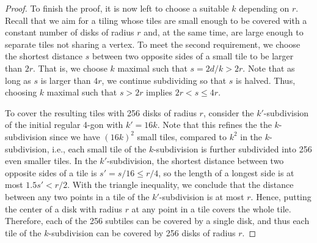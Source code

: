 \documentclass[a4paper,english,cleveref,thm-restate]{lipics-v2021}
\renewcommand{\phi}{\varphi}
\begin{document}
\begin{proof}

    
    To finish the proof, it is now left to choose a suitable $ k $ depending on $ r $.
    Recall that we aim for a tiling whose tiles are small enough to be covered with a constant number of disks of radius $ r $ and, at the same time, are large enough to separate tiles not sharing a vertex.
    To meet the second requirement, we choose the shortest distance $ s $ between two opposite sides of a small tile to be larger than $ 2r $.
    That is, we choose $ k $ maximal such that $ s = 2d / k > 2r $.
    Note that as long as $s$ is larger than $4r$, we continue subdividing so that $s$ is halved.
    Thus, choosing $k$ maximal such that $s > 2r$ implies $2r < s \le 4r$.

    To cover the resulting tiles with 256 disks of radius $ r $, consider the $ k' $-subdivision of the initial regular 4-gon with $ k' = 16 k $.
    Note that this refines the the $ k $-subdivision since we have $ (16 k)^2 $ small tiles, compared to $ k^2 $ in the $ k $-subdivision, i.e., each small tile of the $ k $-subdivision is further subdivided into 256 even smaller tiles.
    In the $ k' $-subdivision, the shortest distance between two opposite sides of a tile is $ s' = s / 16 \leq r / 4 $, so the length of a longest side is at most $ 1.5 s' < r / 2 $.
    With the triangle inequality, we conclude that the distance between any two points in a tile of the $ k' $-subdivision is at most $ r $.
    Hence, putting the center of a disk with radius $ r $ at any point in a tile covers the whole tile.
    Therefore, each of the 256 subtiles can be covered by a single disk, and thus each tile of the $ k $-subdivision can be covered by 256 disks of radius $ r $.


\end{proof}
\end{document}
